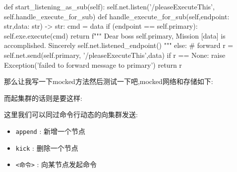 \begin{simplepy}
    def start_listening_as_sub(self):
        self.net.listen('/pleaseExecuteThis',
                        self.handle_execute_for_sub)
    def handle_execute_for_sub(self,endpoint: str,data: str) -> str:
        cmd = data
        if (endpoint == self.primary):
            self.exe.execute(cmd)
            return f"""
            Dear boss {self.primary},
                 Mission [{data}] is accomplished.
                     Sincerely
                     {self.net.listened_endpoint()}
            """
        else:
            # forward
            r = self.net.send(self.primary,
                                 '/pleaseExecuteThis',data)
            if r == None:
                raise Exception('failed to forward message to primary')
            return r

\end{simplepy}
那么让我写一下mocked方法然后测试一下吧,mocked网络和存储如下:
\begin{simplepy}
  
\end{simplepy}
而起集群的话则是要这样:
\begin{simplepy}
  
\end{simplepy}

这里我们可以同过命令行动态的向集群发送:
\begin{itemize}
\item \texttt{append} : 新增一个节点
\item \texttt{kick}  : 删除一个节点
\item {} \texttt{<命令>} : 向某节点发起命令
\end{itemize}

